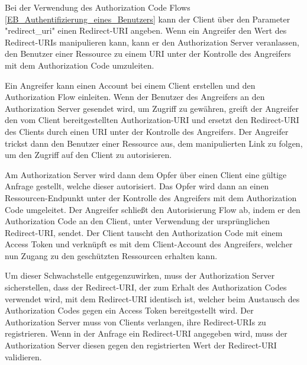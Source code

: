 Bei der Verwendung des Authorization Code Flows \ref{EB_Authentifizierung_eines_Benutzers} kann der Client über den Parameter "redirect\_uri" einen Redirect-URI angeben. Wenn ein Angreifer den Wert des Redirect-URIs manipulieren kann, kann er den Authorization Server veranlassen, den Benutzer einer Ressource zu einem URI unter der Kontrolle des Angreifers mit dem Authorization Code umzuleiten. \cite{OAuthAuthorizationSecurityConsiderations}

Ein Angreifer kann einen Account bei einem Client erstellen und den Authorization Flow einleiten. Wenn der Benutzer des Angreifers an den Authorization Server gesendet wird, um Zugriff zu gewähren, greift der Angreifer den vom Client bereitgestellten Authorization-URI und ersetzt den Redirect-URI des Clients durch einen URI unter der Kontrolle des Angreifers. Der Angreifer trickst dann den Benutzer einer Ressource aus, dem manipulierten Link zu folgen, um den Zugriff auf den Client zu autorisieren. \cite{OAuthAuthorizationSecurityConsiderations}

Am Authorization Server wird dann dem Opfer über einen Client eine gültige Anfrage gestellt, welche dieser autorisiert. Das Opfer wird dann an einen Ressourcen-Endpunkt unter der Kontrolle des Angreifers mit dem Authorization Code umgeleitet. Der Angreifer schließt den Autorisierung Flow ab, indem er den Authorization Code an den Client, unter Verwendung der ursprünglichen Redirect-URI, sendet. Der Client tauscht den Authorization Code mit einem Access Token und verknüpft es mit dem Client-Account des Angreifers, welcher nun Zugang zu den geschützten Ressourcen erhalten kann. \cite{OAuthAuthorizationSecurityConsiderations}

Um dieser Schwachstelle entgegenzuwirken, muss der Authorization Server sicherstellen, dass der Redirect-URI, der zum Erhalt des Authorization Codes verwendet wird, mit dem Redirect-URI identisch ist, welcher beim Austausch des Authorization Codes gegen ein Access Token bereitgestellt wird. Der Authorization Server muss von Clients verlangen, ihre Redirect-URIs zu registrieren.  Wenn in der Anfrage ein Redirect-URI angegeben wird, muss der Authorization Server diesen gegen den registrierten Wert der Redirect-URI validieren. \cite{OAuthAuthorizationSecurityConsiderations}


